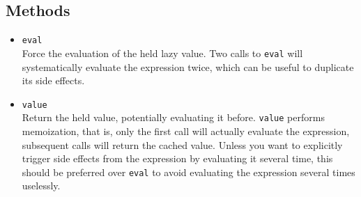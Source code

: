 \subsection{Methods}

\begin{itemize}
\item \lstinline|eval|\\
  Force the evaluation of the held lazy value. Two calls to
  \lstinline|eval| will systematically evaluate the expression twice,
  which can be useful to duplicate its side effects.

\item \lstinline|value|\\
  Return the held value, potentially evaluating it
  before. \lstinline|value| performs memoization, that is, only the
  first call will actually evaluate the expression, subsequent calls
  will return the cached value. Unless you want to explicitly trigger
  side effects from the expression by evaluating it several time, this
  should be preferred over \lstinline|eval| to avoid evaluating the
  expression several times uselessly.
\end{itemize}


